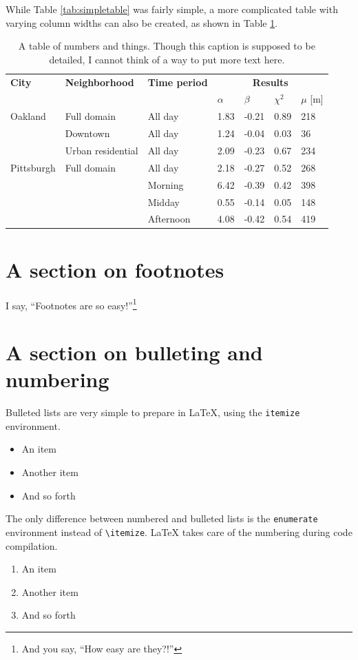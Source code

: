 While Table \ref{tab:simpletable} was fairly simple, a more complicated table with varying column widths can also be created, as shown in Table \ref{tab:complextable}.

\begin{table}[!h]
\caption[A slightly more complex table]{A table of numbers and things. Though this caption is supposed to be detailed, I cannot think of a way to put more text here.}
\label{tab:complextable}
\begin{tabular}{|p{20mm}|p{40mm}|p{30mm}|p{10mm}p{10mm}p{10mm}p{10mm}|}
\hline
\textbf{City}&\textbf{Neighborhood}&\textbf{Time period}&\multicolumn{4}{c|}{\textbf{Results}}\\
&	&	& $\alpha$&$\beta$&$\chi^2$&$\mu$ [m]\\
\hline
Oakland&Full domain&All day&1.83&-0.21&0.89&218\\
 &Downtown&All day&1.24&-0.04&0.03&36\\
 &Urban residential&All day&2.09&-0.23&0.67&234\\
 \hline
Pittsburgh&Full domain&All day&2.18&-0.27&0.52&268\\
 & &Morning&6.42&-0.39&0.42&398\\
 &	 &Midday&0.55&-0.14&0.05&148\\
 & &Afternoon&4.08&-0.42&0.54&419\\
\hline
\end{tabular}
\end{table}

\section{A section on footnotes}\label{sec-footnotes}
I say, ``Footnotes are so easy!''\footnote{And you say, ``How easy are they?!''}

\section{A section on bulleting and numbering}\label{sec-itemizing}
Bulleted lists are very simple to prepare in \LaTeX{}, using the \verb|itemize| environment.
\begin{itemize}
\item An item
\item Another item
\item And so forth
\end{itemize}

The only difference between numbered and bulleted lists is the \verb|enumerate| environment instead of \verb|\itemize|. \LaTeX{} takes care of the numbering during code compilation.
\begin{enumerate}
\item An item
\item Another item
\item And so forth
\end{enumerate}

